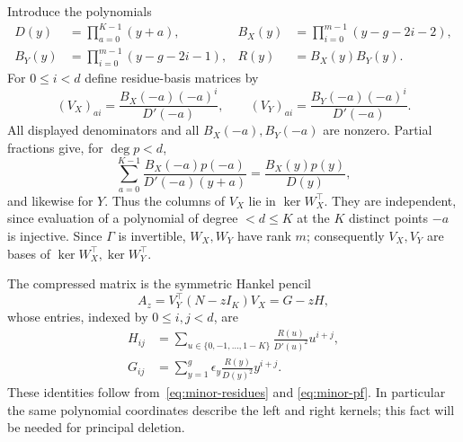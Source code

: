 Introduce the polynomials
\begin{align*}
 D(y)&=\prod_{a=0}^{K-1}(y+a),&
 B_X(y)&=\prod_{i=0}^{m-1}(y-g-2i-2),\\
 B_Y(y)&=\prod_{i=0}^{m-1}(y-g-2i-1),& R(y)&=B_X(y)B_Y(y).
\end{align*}
For $0\le i<d$ define residue-basis matrices by
\begin{equation}\label{eq:minor-residues}
 (V_X)_{a i}=\frac{B_X(-a)(-a)^i}{D'(-a)},\qquad
 (V_Y)_{a i}=\frac{B_Y(-a)(-a)^i}{D'(-a)}.
\end{equation}
All displayed denominators and all $B_X(-a),B_Y(-a)$ are nonzero.
Partial fractions give, for $\deg p<d$,
\begin{equation}\label{eq:minor-pf}
 \sum_{a=0}^{K-1}\frac{B_X(-a)p(-a)}{D'(-a)(y+a)}
       =\frac{B_X(y)p(y)}{D(y)},
\end{equation}
and likewise for $Y$. Thus the columns of $V_X$ lie in
$\ker W_X^{\top}$. They are independent, since evaluation of a polynomial
of degree $<d\le K$ at the $K$ distinct points $-a$ is injective.
Since $\Gamma$ is invertible, $W_X,W_Y$ have rank $m$; consequently $V_X,V_Y$
are bases of $\ker W_X^{\top},\ker W_Y^{\top}$.

The compressed matrix is the symmetric Hankel pencil
\[
 A_z=V_Y^{\top}(N-zI_K)V_X=G-zH,
\]
whose entries, indexed by $0\le i,j<d$, are
\begin{align}
 H_{ij}&=\sum_{u\in\{0,-1,\ldots,1-K\}}
             \frac{R(u)}{D'(u)^2}u^{i+j},\label{eq:minor-H}\\
 G_{ij}&=\sum_{y=1}^{g}\epsilon_y\frac{R(y)}{D(y)^2}y^{i+j}.
 \label{eq:minor-G}
\end{align}
These identities follow from~\eqref{eq:minor-residues} and
\eqref{eq:minor-pf}. In particular the same polynomial coordinates describe
the left and right kernels; this fact will be needed for principal deletion.

